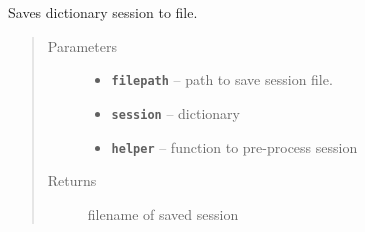 \documentclass[letterpaper,10pt,english]{sphinxmanual}
\begin{document}

\begin{fulllineitems}
\label{RRtoolbox.lib:RRtoolbox.lib.session.saveSession}
Saves dictionary session to file.
\begin{quote}\begin{description}
\item[{Parameters}] \leavevmode\begin{itemize}
\item {} 
\textbf{\texttt{filepath}} -- path to save session file.

\item {} 
\textbf{\texttt{session}} -- dictionary

\item {} 
\textbf{\texttt{helper}} -- function to pre-process session

\end{itemize}

\item[{Returns}] \leavevmode
filename of saved session

\end{description}\end{quote}

\end{fulllineitems}

\end{document}
